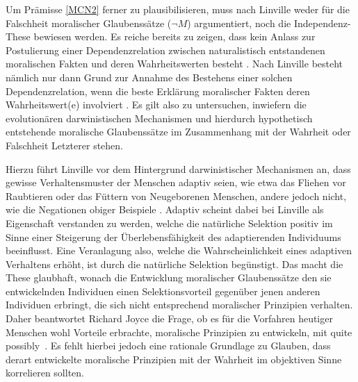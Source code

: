 \documentclass[a4paper,11pt]{article}
\numberwithin{equation}{section}
\begin{document}
Um Prämisse \ref{MCN2} ferner zu plausibilisieren, muss nach Linville weder für die Falschheit moralischer Glaubenssätze ($\neg M$) argumentiert, noch die Independenz-These bewiesen werden. Es reiche bereits zu zeigen, dass kein Anlass zur Postulierung einer Dependenzrelation zwischen naturalistisch entstandenen moralischen Fakten und deren Wahrheitswerten besteht \cite[S. 396]{Linville2009-LINTMA-2}. Nach Linville besteht nämlich nur dann Grund zur Annahme des Bestehens einer solchen Dependenzrelation, wenn die beste Erklärung moralischer Fakten deren Wahrheitswert(e) involviert \cite[S. 396]{Linville2009-LINTMA-2}. Es gilt also zu untersuchen, inwiefern die evolutionären darwinistischen Mechanismen und hierdurch hypothetisch entstehende moralische Glaubenssätze im Zusammenhang mit der Wahrheit oder Falschheit Letzterer stehen.

Hierzu führt Linville vor dem Hintergrund darwinistischer Mechanismen an, dass gewisse Verhaltensmuster der Menschen adaptiv seien, wie etwa das Fliehen vor Raubtieren oder das Füttern von Neugeborenen Menschen, andere jedoch nicht, wie die Negationen obiger Beispiele \cite[S. 396]{Linville2009-LINTMA-2}. Adaptiv scheint dabei bei Linville als Eigenschaft verstanden zu werden, welche die natürliche Selektion positiv im Sinne einer Steigerung der Überlebensfähigkeit des adaptierenden Individuums beeinflusst. Eine Veranlagung also, welche die Wahrscheinlichkeit eines adaptiven Verhaltens erhöht, ist durch die natürliche Selektion begünstigt. Das macht die These glaubhaft, wonach die Entwicklung moralischer Glaubenssätze den sie entwickelnden Individuen einen Selektionsvorteil gegenüber jenen anderen Individuen erbringt, die sich nicht entsprechend moralischer Prinzipien verhalten. Daher beantwortet Richard Joyce die Frage, ob es für die Vorfahren heutiger Menschen wohl Vorteile erbrachte, moralische Prinzipien zu entwickeln, mit \flqq quite possibly\frqq\ \cite[S. 183]{Joyce.2006}. Es fehlt hierbei jedoch eine rationale Grundlage zu Glauben, dass derart entwickelte moralische Prinzipien mit der Wahrheit im objektiven Sinne korrelieren sollten. 
\end{document}
